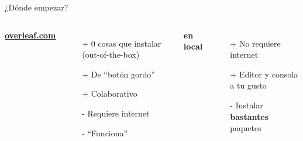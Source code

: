 \begin{frame}{¿Dónde empezar?}
    \begin{columns}

            \pause

            \begin{center}
                \textbf{\href{https://overleaf.com}{overleaf.com}}
            \end{center}
            \begin{itemize}
                \item[+] 0 cosas que instalar (out-of-the-box) 
                \item[+] De ``botón gordo''
                \item[+] Colaborativo
                \item[-] Requiere internet
                \item[-] ``Funciona''
            \end{itemize}

            \pause

            
            \begin{center}
                \textbf{en local}        
            \end{center}
            \begin{itemize}
                \item[+] No requiere internet
                \item[+] Editor y consola a tu gusto
                \item[-] Instalar \textbf{bastantes} paquetes
            \end{itemize}

    \end{columns}
\end{frame}